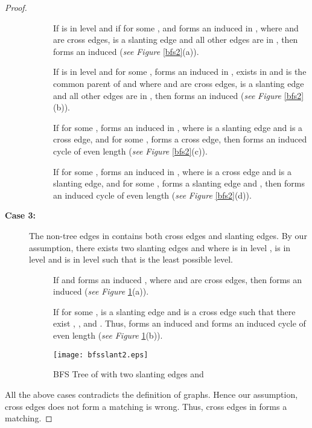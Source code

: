 \documentclass[runningheads]{llncs}
\begin{document}
\begin{proof}
\begin{description}
\begin{description}

\item[] If  is in level  and if for some ,  and  forms an induced  in , where  and  are cross edges,  is a slanting edge and all other edges are in , then  forms an induced  (\emph{see} \emph{Figure }\ref{bfs2}(a)). 


\item[] If  is in level  and for some ,  forms an induced  in ,  exists in  and  is the common parent of  and  where  and  are cross edges,  is a slanting edge and all other edges are in , then forms an induced  (\emph{see} \emph{Figure }\ref{bfs2}(b)).

\item[] If for some ,  forms an induced  in , where  is a slanting edge and  is a cross edge, and for some ,  forms a cross edge, then  forms an induced cycle of even length (\emph{see} \emph{Figure }\ref{bfs2}(c)). 

\item[] If for some ,  forms an induced  in , where  is a cross edge and  is a slanting edge, and for some ,  forms a slanting edge and , then  forms an induced cycle of even length (\emph{see} \emph{Figure }\ref{bfs2}(d)). 



\end{description}

\item[\textbf{Case 3:}] The non-tree edges in  contains both cross edges and slanting edges. By our assumption, there exists two slanting edges   and  where  is in level ,  is in level  and  is in level  such that  is the least possible level. 

\begin{description}
\item[] If  and  forms an induced , where  and  are cross edges, then  forms an induced  
(\emph{see} \emph{Figure }\ref{fig:bfs3}(a)).    

\item[] If for some ,  is a slanting edge and  is a cross edge such that there exist , ,  and . Thus,  forms an induced  and  forms an induced cycle of even length 
(\emph{see} \emph{Figure }\ref{fig:bfs3}(b)).    
\end{description}

\begin{figure}[h]
\begin{center}
\texttt{[image: bfsslant2.eps]}
\caption{BFS Tree  of  with two slanting edges  and }
\label{fig:bfs3}
\end{center}
\end{figure}

\end{description}
All the above cases contradicts the definition of  graphs. Hence our assumption, cross edges does not form a matching is wrong. Thus, cross edges in  forms a matching. 

\end{proof}
\end{document}
